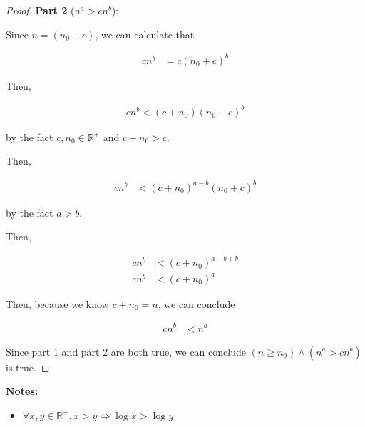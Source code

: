 \documentclass[12pt]{article}
\begin{document}
\begin{enumerate}[a.]
\begin{proof}
    \textbf{Part 2} ($n^a > cn^b$):

    \bigskip

    Since $n = (n_0 + c)$, we can calculate that

    \begin{align}
        cn^b &= c(n_0 + c)^b
    \end{align}

    \bigskip

    Then,

    \begin{align}
        cn^b < (c + n_0)(n_0 + c)^b
    \end{align}

    by the fact $c,n_0 \in \mathbb{R}^{+}$ and $c + n_0 > c$.

    \bigskip

    Then,

    \begin{align}
        cn^b &< (c + n_0)^{a-b}(n_0 + c)^b
    \end{align}

    by the fact $a > b$.

    \bigskip

    Then,

    \begin{align}
        cn^b &< (c + n_0)^{a-b+b}\\
        cn^b &< (c + n_0)^{a}
    \end{align}

    \bigskip

    Then, because we know $c + n_0 = n$, we can conclude

    \begin{align}
        cn^b &< n^a
    \end{align}

    \bigskip

    Since part 1 and part 2 are both true, we can conclude $(n \geq n_0) \land (n^a > cn^b)$ is true.

    \end{proof}

    \bigskip

    \textbf{Notes:}

    \begin{itemize}
        \item
        $\forall x,y \in \mathbb{R}^{+}, x > y \Leftrightarrow \log x > \log y$
    \end{itemize}
\end{enumerate}
\end{document}
